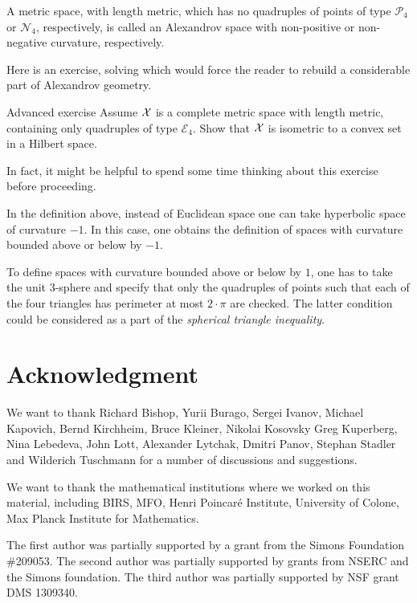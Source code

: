 A metric space, with length metric, 
which has no quadruples of points of type $\mathcal{P}_4$ or $\mathcal{N}_4$, 
respectively,  
is called an Alexandrov space with non-positive or non-negative curvature, respectively.

Here is an exercise, solving which would force the reader to rebuild a considerable part of Alexandrov geometry.

\begin{thm}{Advanced exercise}\label{ex:convex-set}
Assume $\mathcal{X}$ is a complete metric space with length metric, 
containing only quadruples of type $\mathcal{E}_4$.
Show that $\mathcal{X}$ is isometric to a convex set in a Hilbert space.
\end{thm}

In fact, it might be helpful to spend some time thinking about this exercise before proceeding.

In the definition above, 
instead of  Euclidean space 
one can take  
hyperbolic space of curvature $-1$.
In this case,
one obtains the definition of spaces with curvature bounded above or below by $-1$.

To define spaces with curvature bounded above or below by $1$,
one has to take the unit 3-sphere 
and specify that only the quadruples of points such that each of the four triangles has perimeter 
 at most $2\cdot\pi$ are checked.
The latter condition could be considered as a part of the {}\emph{spherical triangle inequality}.


\section*{Acknowledgment}
We want to thank 
Richard Bishop,
Yurii Burago,
Sergei Ivanov,
Michael Kapovich, 
Bernd Kirchheim, 
Bruce Kleiner,
Nikolai Kosovsky
Greg Kuperberg,
Nina Lebedeva,
John Lott,
Alexander Lytchak,
Dmitri Panov,
Stephan Stadler
and 
Wilderich Tuschmann
for a number of discussions and suggestions.


We want to thank the mathematical institutions where we worked on this material,  including
BIRS, 
MFO, 
Henri Poincar\'{e} Institute,
University of Colone, 
Max Planck Institute for Mathematics. 

The first author was partially supported by a grant from the Simons Foundation \#209053.
The second author was partially supported by grants from NSERC and the Simons foundation.
The third author was partially supported by NSF grant DMS 1309340.

